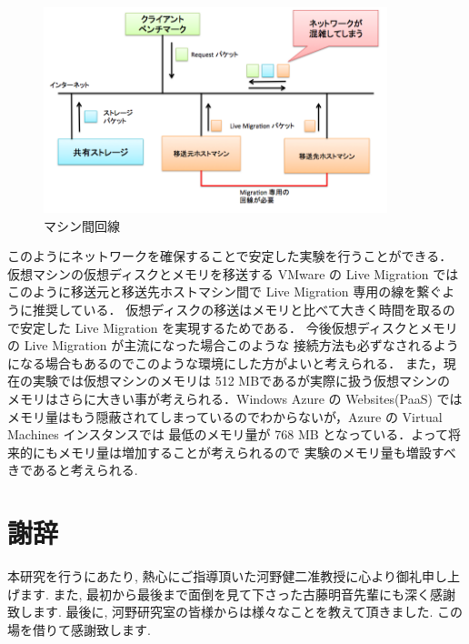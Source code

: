 \documentclass[graduation-thesis]{mlarticle}
\begin{document}
\begin{figure}[H]\begin{center}\includegraphics[width=10.0cm]{./img/nic.png}\caption{ マシン間回線}\label{nic}\end{center}\end{figure}

このようにネットワークを確保することで安定した実験を行うことができる．
仮想マシンの仮想ディスクとメモリを移送する VMware の Live Migration では
このように移送元と移送先ホストマシン間で Live Migration 専用の線を繋ぐように推奨している．
仮想ディスクの移送はメモリと比べて大きく時間を取るので安定した Live Migration を実現するためである．
今後仮想ディスクとメモリの Live Migration が主流になった場合このような
接続方法も必ずなされるようになる場合もあるのでこのような環境にした方がよいと考えられる．
また，現在の実験では仮想マシンのメモリは 512 MBであるが実際に扱う仮想マシンの
メモリはさらに大きい事が考えられる．Windows Azure\cite{azure} の Websites(PaaS) では
メモリ量はもう隠蔽されてしまっているのでわからないが，Azure の Virtual Machines インスタンスでは
最低のメモリ量が 768 MB となっている．よって将来的にもメモリ量は増加することが考えられるので
実験のメモリ量も増設すべきであると考えられる.


\clearpage
\section{謝辞}
\label{sec-8}
本研究を行うにあたり, 熱心にご指導頂いた河野健二准教授に心より御礼申し上げます. 
また, 最初から最後まで面倒を見て下さった古藤明音先輩にも深く感謝致します. 
最後に, 河野研究室の皆様からは様々なことを教えて頂きました. この場を借りて感謝致します.
\clearpage



\end{document}
